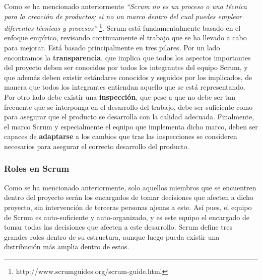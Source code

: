 Como se ha mencionado anteriormente \textit{``Scrum no es un proceso o una técnica para la creación de productos; si no un marco dentro del cual puedes emplear diferentes técnicas y procesos''} \footnote{http://www.scrumguides.org/scrum-guide.html}. Scrum está fundamentalmente basado en el enfoque empírico, revisando continuamente el trabajo que se ha llevado a cabo para mejorar. Está basado principalmente en tres pilares. Por un lado encontramos la \textbf{transparencia}, que implica que todos los aspectos importantes del proyecto deben ser conocidos por todos los integrantes del equipo Scrum, y que además deben existir estándares conocidos y seguidos por los implicados, de manera que todos los integrantes entiendan aquello que se está representando. Por otro lado debe existir una \textbf{inspección}, que pese a que no debe ser tan frecuente que se interponga en el desarrollo del trabajo, debe ser suficiente como para asegurar que el producto se desarrolla con la calidad adecuada. Finalmente, el marco Scrum y especialmente el equipo que implementa dicho marco, deben ser capaces de \textbf{adaptarse} a los cambios que tras las inspecciones se consideren necesarios para asegurar el correcto desarrollo del producto.

\subsubsection{Roles en Scrum}

Como se ha mencionado anteriormente, solo aquellos miembros que se encuentren dentro del proyecto serán los encargados de tomar decisiones que afecten a dicho proyecto, sin intervención de terceras personas ajenas a este. Así pues, el equipo de Scrum es auto-suficiente y auto-organizado, y es este equipo el encargado de tomar todas las decisiones que afecten a este desarrollo. Scrum define tres grandes roles dentro de su estructura, aunque luego pueda existir una distribución más amplia dentro de estos.

